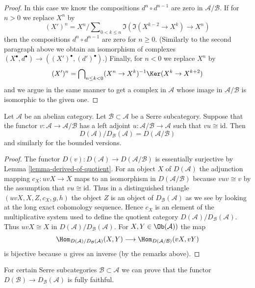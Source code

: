 \begin{proof}
\medskip\noindent
In this case we know the compositions $d^n \circ d^{n - 1}$
are zero in $\mathcal{A}/\mathcal{B}$. If for $n > 0$ we replace
$X^n$ by
$$
(X')^n = X^n/\sum\nolimits_{0 < k \leq n} \Im(\Im(X^{k - 2} \to X^k) \to X^n)
$$
then the compositions $d^n \circ d^{n - 1}$ are zero for $n \geq 0$.
(Similarly to the second paragraph above we obtain an isomorphism of
complexes
$(X^\bullet, d^\bullet) \to ((X')^\bullet, (d')^\bullet)$.)
Finally, for $n < 0$ we replace $X^n$ by
$$
(X')^n = \bigcap\nolimits_{n \leq k < 0}
(X^n \to X^k)^{-1}\Ker(X^k \to X^{k + 2})
$$
and we argue in the same manner to get a complex in $\mathcal{A}$
whose image in $\mathcal{A}/\mathcal{B}$ is isomorphic to the given one.
\end{proof}

\begin{lemma}
\label{lemma-quotient-by-serre-easy}
Let $\mathcal{A}$ be an abelian category.
Let $\mathcal{B} \subset \mathcal{A}$ be a Serre subcategory.
Suppose that the functor $v : \mathcal{A} \to \mathcal{A}/\mathcal{B}$
has a left adjoint $u : \mathcal{A}/\mathcal{B} \to \mathcal{A}$
such that $vu \cong \text{id}$. Then
$$
D(\mathcal{A})/D_\mathcal{B}(\mathcal{A}) = D(\mathcal{A}/\mathcal{B})
$$
and similarly for the bounded versions.
\end{lemma}

\begin{proof}
The functor $D(v) : D(\mathcal{A}) \to D(\mathcal{A}/\mathcal{B})$
is essentially surjective by
Lemma \ref{lemma-derived-of-quotient}.
For an object $X$ of $D(\mathcal{A})$ the adjunction mapping
$c_X : uvX \to X$ maps to an isomorphism in $D(\mathcal{A}/\mathcal{B})$
because $vuv \cong v$ by the assumption that $vu \cong \text{id}$.
Thus in a distinguished triangle $(uvX, X, Z, c_X, g, h)$ the object
$Z$ is an object of $D_\mathcal{B}(\mathcal{A})$ as we see by looking
at the long exact cohomology sequence.
Hence $c_X$ is an element of the multiplicative system used to define
the quotient category $D(\mathcal{A})/D_\mathcal{B}(\mathcal{A})$.
Thus $uvX \cong X$ in $D(\mathcal{A})/D_\mathcal{B}(\mathcal{A})$.
For $X, Y \in \Ob(\mathcal{A}))$ the map
$$
\Hom_{D(\mathcal{A})/D_\mathcal{B}(\mathcal{A})}(X, Y)
\longrightarrow
\Hom_{D(\mathcal{A}/\mathcal{B})}(vX, vY)
$$
is bijective because $u$ gives an inverse (by the remarks above).
\end{proof}

\noindent
For certain Serre subcategories $\mathcal{B} \subset \mathcal{A}$
we can prove that the functor
$D(\mathcal{B}) \to D_\mathcal{B}(\mathcal{A})$
is fully faithful.

